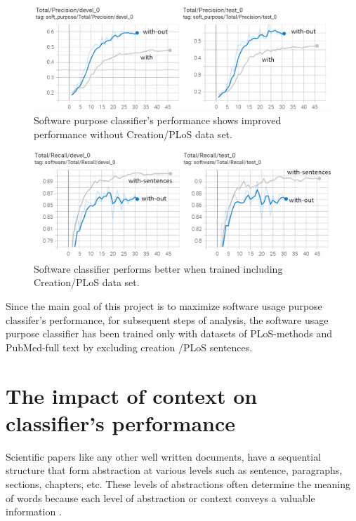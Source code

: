 \begin{figure}[htbp]
	\centering
	\includegraphics[width=.90\textwidth]{4.graphics/figures/ch_6/1.with_sent_vs_without/HD/1}
	\caption{Software purpose classifier's performance shows improved performance without Creation/PLoS data set.}
	\label{fig:chapter06:without}
\end{figure}


\begin{figure}[htbp]
	\centering
	\includegraphics[width=.88\textwidth]{4.graphics/figures/ch_6/1.with_sent_vs_without/HD/2}
	\caption{Software classifier performs better when trained including Creation/PLoS data set.}
	\label{fig:chapter06:with}
\end{figure}

Since the main goal of this project is to maximize software usage purpose classifer’s performance, for subsequent steps of analysis, the software usage purpose classifier has been trained only with datasets of PLoS-methods and PubMed-full text by excluding creation /PLoS sentences. 

\section{The impact of context on classifier’s performance }
\label{sec:chapter06:context}

Scientific papers like any other well written documents, have a sequential structure that form abstraction at various levels such as sentence, paragraphs, sections, chapters, etc. These levels of abstractions often determine the meaning of words because each level of abstraction or context conveys a valuable information \citep{ghosh2016contextual}. \\

